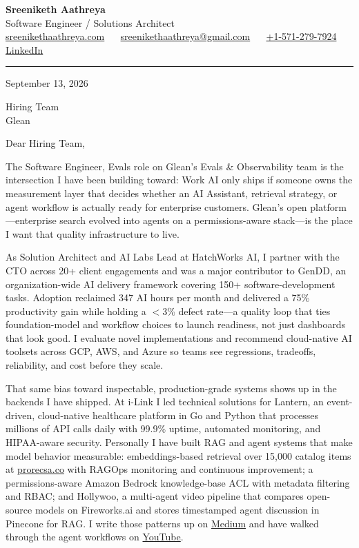 \documentclass[11pt, letterpaper]{article}
\begin{document}
{\fontsize{18 pt}{20 pt}\selectfont\bfseries Sreeniketh Aathreya}\\[4pt]
Software Engineer / Solutions Architect\\[6pt]
\href{https://sreenikethaathreya.com}{sreenikethaathreya.com}
~\textbullet~
\href{mailto:sreenikethaathreya@gmail.com}{sreenikethaathreya@gmail.com}
~\textbullet~
\href{tel:+1-571-279-7924}{+1-571-279-7924}
~\textbullet~
\href{https://www.linkedin.com/in/sreeniketh-aathreya-16800b122/}{LinkedIn}

\vspace{12pt}
\hrule
\vspace{12pt}

September 13, 2026

\vspace{8pt}

Hiring Team\\
Glean

\vspace{12pt}

Dear Hiring Team,

The Software Engineer, Evals role on Glean's Evals \& Observability team is the intersection I have been building toward: Work AI only ships if someone owns the measurement layer that decides whether an AI Assistant, retrieval strategy, or agent workflow is actually ready for enterprise customers. Glean's open platform---enterprise search evolved into agents on a permissions-aware stack---is the place I want that quality infrastructure to live.

As Solution Architect and AI Labs Lead at HatchWorks AI, I partner with the CTO across 20+ client engagements and was a major contributor to GenDD, an organization-wide AI delivery framework covering 150+ software-development tasks. Adoption reclaimed 347 AI hours per month and delivered a 75\% productivity gain while holding a $<$3\% defect rate---a quality loop that ties foundation-model and workflow choices to launch readiness, not just dashboards that look good. I evaluate novel implementations and recommend cloud-native AI toolsets across GCP, AWS, and Azure so teams see regressions, tradeoffs, reliability, and cost before they scale.

That same bias toward inspectable, production-grade systems shows up in the backends I have shipped. At i-Link I led technical solutions for Lantern, an event-driven, cloud-native healthcare platform in Go and Python that processes millions of API calls daily with 99.9\% uptime, automated monitoring, and HIPAA-aware security. Personally I have built RAG and agent systems that make model behavior measurable: embeddings-based retrieval over 15,000 catalog items at \href{https://prorecsa.co}{prorecsa.co} with RAGOps monitoring and continuous improvement; a permissions-aware Amazon Bedrock knowledge-base ACL with metadata filtering and RBAC; and Hollywoo, a multi-agent video pipeline that compares open-source models on Fireworks.ai and stores timestamped agent discussion in Pinecone for RAG. I write those patterns up on \href{https://medium.com/@sreenikethaathreya}{Medium} and have walked through the agent workflows on \href{https://www.youtube.com/watch?v=KBs_3V0OAgU}{YouTube}.
\end{document}
